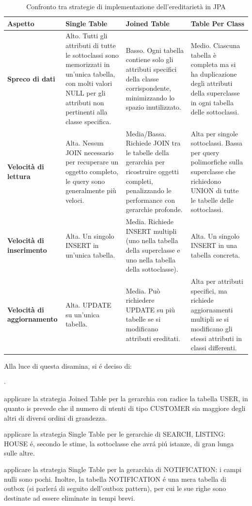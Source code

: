 \begin{table}[H]
    \centering
    \begin{tabularx}{\textwidth}{|X|X|X|X|}
    \hline
    \textbf{Aspetto} & \textbf{Single Table} & \textbf{Joined Table} & \textbf{Table Per Class} \\
    \hline
    \textbf{Spreco di dati} & 
    Alto. Tutti gli attributi di tutte le sottoclassi sono memorizzati in un'unica tabella, con molti valori NULL per gli attributi non pertinenti alla classe specifica. & 
    Basso. Ogni tabella contiene solo gli attributi specifici della classe corrispondente, minimizzando lo spazio inutilizzato. & 
    Medio. Ciascuna tabella è completa ma si ha duplicazione degli attributi della superclasse in ogni tabella delle sottoclassi. \\
    \hline
    \textbf{Velocità di lettura} & 
    Alta. Nessun JOIN necessario per recuperare un oggetto completo, le query sono generalmente più veloci. & 
    Media/Bassa. Richiede JOIN tra le tabelle della gerarchia per ricostruire oggetti completi, penalizzando le performance con gerarchie profonde. & 
    Alta per singole sottoclassi. Bassa per query polimorfiche sulla superclasse che richiedono UNION di tutte le tabelle delle sottoclassi. \\
    \hline
    \textbf{Velocità di inserimento} & 
    Alta. Un singolo INSERT in un'unica tabella. & 
    Media. Richiede INSERT multipli (uno nella tabella della superclasse e uno nella tabella della sottoclasse). & 
    Alta. Un singolo INSERT in una tabella concreta. \\
    \hline
    \textbf{Velocità di aggiornamento} & 
    Alta. UPDATE su un'unica tabella. & 
    Media. Può richiedere UPDATE su più tabelle se si modificano attributi ereditati. & 
    Alta per attributi specifici, ma richiede aggiornamenti multipli se si modificano gli stessi attributi in classi differenti. \\
    \hline
    \end{tabularx}
    \caption{Confronto tra strategie di implementazione dell'ereditarietà in JPA}
    \label{tab:inheritance-comparison}
    \end{table}

Alla luce di questa disamina, si é deciso di:
\begin{list}{$\cdot$}{}
    \item applicare la strategia Joined Table per la gerarchia con radice la tabella USER, in quanto
    is prevede che il numero di utenti di tipo CUSTOMER sia maggiore 
    degli altri di diversi ordini di grandezza.
    \item applicare la strategia Single Table per le gerarchie di SEARCH,
    LISTING: HOUSE é, secondo le stime, la sottoclasse che
    avrá piú istanze, di gran lunga sulle altre.
    \item applicare la strategia Single Table per la gerarchia di NOTIFICATION:
    i campi nulli sono pochi. Inoltre, la tabella NOTIFICATION é una mera tabella
    di outbox (si parlerá di seguito dell'outbox pattern), per cui le sue righe sono
    destinate ad essere eliminate in tempi brevi.
\end{list}

